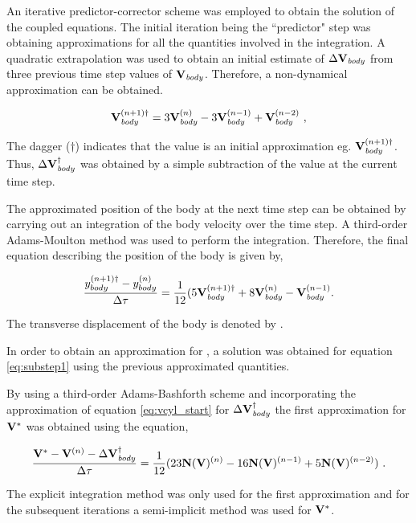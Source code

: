 An iterative predictor-corrector scheme was employed to obtain the solution of the coupled equations. The initial iteration being the ``predictor" step was obtaining approximations for all the quantities involved in  the integration. A quadratic extrapolation was used to obtain an initial estimate of $\Delta\mathbf{V}_{\mathit{body}}$ from  three previous time step values of $\mathbf{V}_{\mathit{body}}$. Therefore, a non-dynamical approximation can be obtained.  
 
 
\begin{equation} \centering
\label{eq:vcyl_start}
\Vcyl^{(n+1)\dag} = 3\Vcyl^{(n)} - 3\Vcyl^{(n-1)} + \Vcyl^{(n-2)} ~,
\end{equation}


The dagger ($\dag$) indicates that the value is an initial approximation eg. $\mathbf{V}_{\mathit{body}}^{(n+1)\dag}$. Thus, $\Delta\mathbf{V}_{\mathit{body}}^{\dag}$ was obtained by a simple subtraction of the value at the current time step. 

The approximated position of the body at the next time step can be obtained by carrying out an integration of the body velocity over the time step. A third-order Adams-Moulton method was used to perform the integration. Therefore, the final equation describing the position of the body is given by, 

\begin{equation} \centering
	\label{eq:ycyl_start}
	\frac{\ycyl^{(n+1)\dag} - \ycyl^{(n)}}{\Delta\tau} = \frac{1}{12}(5\Vcyl^{(n+1)\dag} + 8\Vcyl^{(n)} - \Vcyl^{(n-1)}.
\end{equation}

The transverse displacement of the body is denoted by \ycyl.

In order to obtain an approximation for \Vint, a solution was obtained for equation \ref{eq:substep1} using the previous approximated quantities.

By using a third-order Adams-Bashforth scheme and incorporating the approximation of equation \ref{eq:vcyl_start} for  $\Delta\mathbf{V}_{\mathit{body}}^{\dag}$ the first approximation for $\mathbf{V}^{*}$ was obtained using the equation,
 
\begin{equation} \centering
\label{eq:vint_first}
\frac{\Vint - \Vn - \Delta\Vcyl^{\dag}}{\Delta\tau} = \frac{1}{12}(23\mathbf{N}(\vecV)^{(n)} - 16\mathbf{N}(\vecV)^{(n-1)} + 5\mathbf{N}(\vecV)^{(n-2)}) ~.
\end{equation}

The explicit integration method was only used for the first approximation and for the subsequent iterations a semi-implicit method was used for $\mathbf{V}^{*}$.

